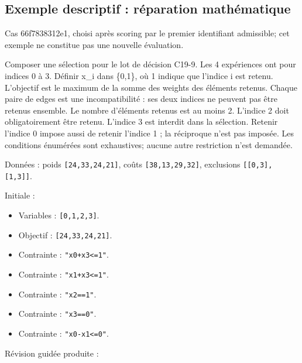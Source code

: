 \documentclass[11pt]{article}
\begin{document}
\subsection{Exemple descriptif : réparation mathématique}

Cas 66f7838312e1, choisi après scoring par le premier identifiant admissible; cet exemple ne constitue pas une nouvelle évaluation.

Composer une sélection pour le lot de décision C19-9. Les 4 expériences ont pour indices 0 à 3. Définir x\_i dans \{0,1\}, où 1 indique que l'indice i est retenu. L'objectif est le maximum de la somme des weights des éléments retenus. Chaque paire de edges est une incompatibilité : ses deux indices ne peuvent pas être retenus ensemble. Le nombre d'éléments retenus est au moins 2. L'indice 2 doit obligatoirement être retenu. L'indice 3 est interdit dans la sélection. Retenir l'indice 0 impose aussi de retenir l'indice 1 ; la réciproque n'est pas imposée. Les conditions énumérées sont exhaustives; aucune autre restriction n'est demandée.

Données : poids \texttt{[\allowbreak{}24,\allowbreak{}33,\allowbreak{}24,\allowbreak{}21]\allowbreak{}}, coûts \texttt{[\allowbreak{}38,\allowbreak{}13,\allowbreak{}29,\allowbreak{}32]\allowbreak{}}, exclusions \texttt{[\allowbreak{}[\allowbreak{}0,\allowbreak{}3]\allowbreak{},\allowbreak{}[\allowbreak{}1,\allowbreak{}3]\allowbreak{}]\allowbreak{}}.

Initiale :

\begin{itemize}
\item Variables : \texttt{[\allowbreak{}0,\allowbreak{}1,\allowbreak{}2,\allowbreak{}3]\allowbreak{}}.
\item Objectif : \texttt{[\allowbreak{}24,\allowbreak{}33,\allowbreak{}24,\allowbreak{}21]\allowbreak{}}.
\item Contrainte : \texttt{"x0+\allowbreak{}x3<=\allowbreak{}1"}.
\item Contrainte : \texttt{"x1+\allowbreak{}x3<=\allowbreak{}1"}.
\item Contrainte : \texttt{"x2=\allowbreak{}=\allowbreak{}1"}.
\item Contrainte : \texttt{"x3=\allowbreak{}=\allowbreak{}0"}.
\item Contrainte : \texttt{"x0-\allowbreak{}x1<=\allowbreak{}0"}.
\end{itemize}

Révision guidée produite :
\end{document}
